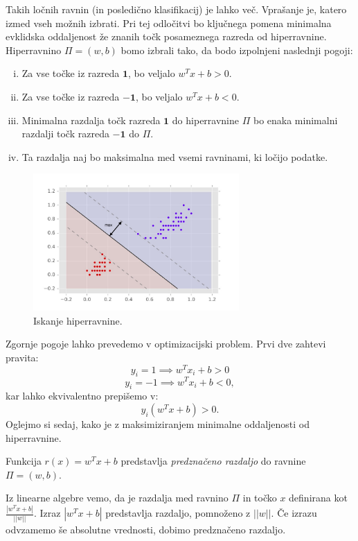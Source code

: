\documentclass[mat1]{fmfdelo}
\newcommand{\pr}{\mathbf 1}
\newcommand{\nr}{\mathbf {-1}}
\begin{document}
Takih ločnih ravnin (in posledično klasifikacij) je lahko več. Vprašanje je, katero izmed vseh možnih izbrati. Pri tej odločitvi bo ključnega pomena minimalna evklidska oddaljenost že znanih točk posameznega razreda od hiperravnine. Hiperravnino $\Pi = (w, b)$ bomo izbrali tako, da bodo izpolnjeni naslednji pogoji: 
\begin{enumerate}[(i)]
	\item 
	Za vse točke iz razreda $\pr$, bo veljalo $w^Tx+ b > 0$.
	\item 
	Za vse točke iz razreda $\nr$, bo veljalo $w^Tx+ b < 0$.
	\item 
	Minimalna razdalja točk razreda $\pr$ do hiperravnine $\Pi$ bo enaka minimalni razdalji točk razreda $\nr$ do $\Pi$.
	\item 
	Ta razdalja naj bo maksimalna med vsemi ravninami, ki ločijo podatke.
\end{enumerate}
\begin{figure}[H]
	\centering
	\includegraphics[width=0.7\textwidth]{slike/LinearnoLocljiviIskanjeHiperravnine.jpg}
	\caption{Iskanje hiperravnine.}
	\label{slikaIskanjeHiperravnine}
\end{figure}



Zgornje pogoje lahko prevedemo v optimizacijski problem. Prvi dve zahtevi pravita: 
$$y_i = 1 \implies w^Tx_i+ b > 0$$
$$y_i = -1 \implies  w^Tx_i+ b < 0,$$
kar lahko ekvivalentno prepišemo v: 
$$  y_i(w^Tx+ b)> 0.$$
Oglejmo si sedaj, kako je z maksimiziranjem minimalne oddaljenosti od hiperravnine. 

\begin{definicija}
	Funkcija $r(x) = w^Tx + b$ predstavlja \emph{predznačeno razdaljo} do ravnine $\Pi= (w, b)$. 
\end{definicija}

Iz linearne algebre vemo, da je razdalja med ravnino $\Pi$ in točko $x$ definirana kot $\frac{|w^Tx+ b|}{||w||}$. Izraz $|w^Tx+ b|$ predstavlja razdaljo, pomnoženo z $||w||$. Če izrazu odvzamemo še absolutne vrednosti, dobimo predznačeno razdaljo. 
\end{document}

